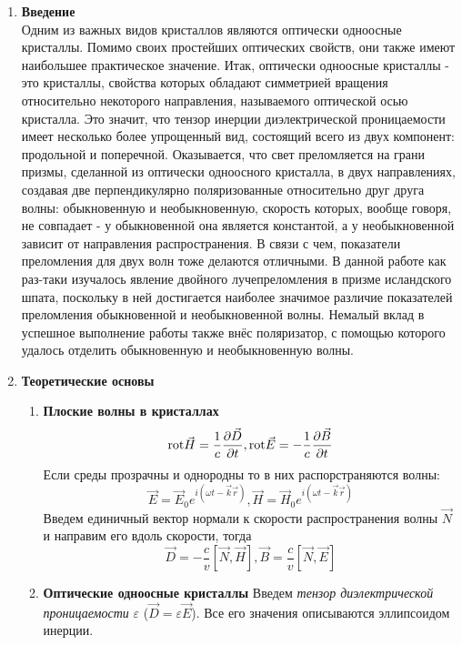 \documentclass[a4paper]{article}
\begin{document}
\begin{multicols}{2}

\begin{enumerate}
\small
\item \textbf{Введение}\\ 
\noindent Одним из важных видов кристаллов являются оптически одноосные кристаллы. Помимо своих простейших оптических свойств, они также имеют наибольшее практическое значение. Итак, оптически одноосные кристаллы - это кристаллы, свойства которых обладают симметрией вращения относительно некоторого направления, называемого оптической осью кристалла. Это значит, что тензор инерции диэлектрической проницаемости имеет несколько более упрощенный вид, состоящий всего из двух компонент: продольной и поперечной. Оказывается, что свет преломляется на грани призмы, сделанной из оптически одноосного кристалла, в двух направлениях, создавая две перпендикулярно поляризованные относительно друг друга волны: обыкновенную и необыкновенную, скорость которых, вообще говоря, не совпадает - у обыкновенной она является константой, а у необыкновенной зависит от направления распространения. В связи с чем, показатели преломления для двух волн тоже делаются отличными. В данной работе как раз-таки изучалось явление двойного лучепреломления в призме исландского шпата, поскольку в ней достигается наиболее значимое различие показателей преломления обыкновенной и необыкновенной волны. Немалый вклад в успешное выполнение работы также внёс поляризатор, с помощью которого удалось отделить обыкновенную и необыкновенную волны.\\
\item \textbf{Теоретические основы}
\begin{enumerate}

\item \textbf{Плоские волны в кристаллах}
\begin{equation} \label{trivial}
\hbox{rot} \vec{H} = \frac{1}{c}\frac{\partial \vec{D}}{\partial t}, \hbox{rot} \vec{E} = -\frac{1}{c}\frac{\partial \vec{B}}{\partial t} 
\end{equation}
Если среды прозрачны и однородны то в них распорстраняются волны:
\begin{equation}
\vec E = \vec{E}_0 e^{i(\omega t - \vec{k}\vec{r})}, \vec{H} = \vec{H}_0e^{i(\omega t - \vec{k}\vec{r})}
\end{equation}
Введем единичный вектор нормали к скорости распространения волны $\vec{N}$ и направим его вдоль скорости, тогда
\begin{equation}
\vec{D} = -\frac{c}{v}\left[\vec{N}, \vec{H}\right], \vec{B} = \frac{c}{v}\left[  \vec{N}, \vec{E}\right]
\end{equation}
\item \textbf{Оптические одноосные кристаллы}
Введем \textit{тензор диэлектрической проницаемости} $\varepsilon$ ($\vec{D} = \varepsilon \vec{E}$). Все его значения описываются эллипсоидом инерции. 


\end{enumerate}
\end{enumerate}
\end{multicols}
\end{document}
